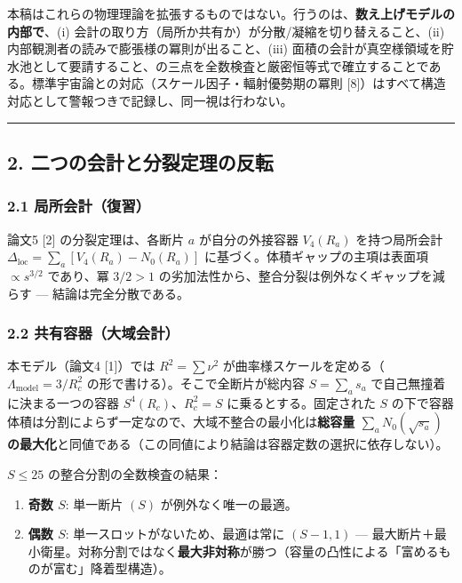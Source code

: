 \documentclass[
]{ltjsarticle}
\providecommand{\tightlist}{%
  \setlength{\itemsep}{0pt}\setlength{\parskip}{0pt}}
\begin{document}
本稿はこれらの物理理論を拡張するものではない。行うのは、\textbf{数え上げモデルの内部で}、(i)
会計の取り方（局所か共有か）が分散/凝縮を切り替えること、(ii)
内部観測者の読みで膨張様の冪則が出ること、(iii)
面積の会計が真空様領域を貯水池として要請すること、の三点を全数検査と厳密恒等式で確立することである。標準宇宙論との対応（スケール因子・輻射優勢期の冪則
{[}8{]}）はすべて構造対応として警報つきで記録し、同一視は行わない。

\begin{center}\rule{0.5\linewidth}{0.5pt}\end{center}

\subsection{2.
二つの会計と分裂定理の反転}\label{ux4e8cux3064ux306eux4f1aux8a08ux3068ux5206ux88c2ux5b9aux7406ux306eux53cdux8ee2}

\subsubsection{2.1
局所会計（復習）}\label{ux5c40ux6240ux4f1aux8a08ux5fa9ux7fd2}

論文5 {[}2{]} の分裂定理は、各断片 \(a\) が自分の外接容器 \(V_4(R_a)\)
を持つ局所会計 \(\Delta_{\mathrm{loc}}=\sum_a[V_4(R_a)-N_0(R_a)]\)
に基づく。体積ギャップの主項は表面項 \(\propto s^{3/2}\) であり、冪
\(3/2>1\) の劣加法性から、整合分裂は例外なくギャップを減らす ---
結論は完全分散である。

\subsubsection{2.2
共有容器（大域会計）}\label{ux5171ux6709ux5bb9ux5668ux5927ux57dfux4f1aux8a08}

本モデル（論文4 {[}1{]}）では \(R^2=\sum\nu^2\)
が曲率様スケールを定める（\(\Lambda_{\mathrm{model}}=3/R_c^2\)
の形で書ける）。そこで全断片が総内容 \(S=\sum_a s_a\)
で自己無撞着に決まる一つの容器 \(S^4(R_c)\)、\(R_c^2=S\)
に乗るとする。固定された \(S\)
の下で容器体積は分割によらず一定なので、大域不整合の最小化は\textbf{総容量
\(\sum_a N_0(\sqrt{s_a})\)
の最大化}と同値である（この同値により結論は容器定数の選択に依存しない）。

\(S\le25\) の整合分割の全数検査の結果：

\begin{enumerate}
\def\labelenumi{\arabic{enumi}.}
\tightlist
\item
  \textbf{奇数 \(S\)}: 単一断片 \((S)\) が例外なく唯一の最適。
\item
  \textbf{偶数 \(S\)}: 単一スロットがないため、最適は常に \((S-1,1)\)
  ---
  最大断片＋最小衛星。対称分割ではなく\textbf{最大非対称}が勝つ（容量の凸性による「富めるものが富む」降着型構造）。
\end{enumerate}
\end{document}
